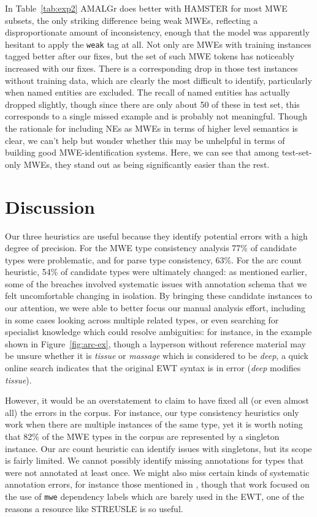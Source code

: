\documentclass[output=paper
,modfonts
,nonflat]{langsci/langscibook}
\newcommand{\lex}[1]{\textit{#1}\xspace}
\newcommand{\mwetype}[1]{\texttt{#1}\xspace}
\newcommand{\weak}{\mwetype{weak}}
\newcommand{\figureref}[1]{Figure~\ref{#1}\xspace}
\newcommand{\tableref}[1]{Table~\ref{#1}\xspace}
\begin{document}
In \tableref{tab:exp2} AMALGr does better with HAMSTER for most MWE subsets, the only striking difference being weak MWEs, reflecting a disproportionate amount of inconsistency, enough that the model was apparently hesitant to apply the \weak tag at all. Not only are MWEs with training instances tagged better after our fixes, but the set of such MWE tokens has noticeably increased with our fixes. There is a corresponding drop in those test instances without training data, which are clearly the most difficult to identify, particularly when named entities are excluded. The recall of named entities has actually dropped slightly, though since there are only about 50 of these in test set, this corresponds to a single missed example and is probably not meaningful. Though the rationale for including NEs as MWEs in terms of higher level semantics is clear, we can't help but wonder whether this may be unhelpful in terms of building good MWE-identification systems. Here, we can see that among test-set-only MWEs, they stand out as being significantly easier than the rest.


\section{Discussion}

Our three heuristics are useful because they identify potential errors with a high degree of precision. For the MWE type consistency analysis 77\% of candidate types were problematic, and for parse type consistency, 63\%. For the arc count heuristic, 54\% of candidate types were ultimately changed: as mentioned earlier, some of the breaches involved systematic issues with annotation schema that we felt uncomfortable changing in isolation. By bringing these candidate instances to our attention, we were able to better focus our manual analysis effort, including in some cases looking across multiple related types, or even searching for specialist knowledge which could resolve ambiguities: for instance, in the example shown in \figureref{fig:arc-ex}, though a layperson without reference material may be unsure whether it is \lex{tissue} or \lex{massage} which is considered to be \lex{deep}, a quick online search indicates that the original EWT syntax is in error (\lex{deep} modifies \lex{tissue}).

However, it would be an overstatement to claim to have fixed all (or even almost all) the errors in the corpus. For instance, our type consistency heuristics only work when there are multiple instances of the same type, yet it is worth noting that 82\% of the MWE types in the corpus are represented by a singleton instance. Our arc count heuristic can identify issues with singletons, but its scope is fairly limited. We cannot possibly identify missing annotations for types that were not annotated at least once. We might also miss certain kinds of systematic annotation errors, for instance those mentioned in \citet{de2015studying}, though that work focused on the use of \mwetype{mwe} dependency labels which are barely used in the EWT, one of the reasons a resource like STREUSLE is so useful.
\end{document}
